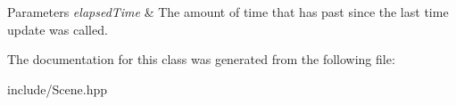 \begin{DoxyParams}{Parameters}
{\em elapsed\+Time} & The amount of time that has past since the last time update was called. \\
\hline
\end{DoxyParams}


The documentation for this class was generated from the following file\+:\begin{DoxyCompactItemize}
\item 
include/Scene.\+hpp\end{DoxyCompactItemize}
